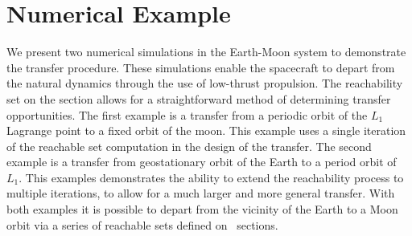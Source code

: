 \documentclass[smallcondensed]{svjour3}
\begin{document}
\section{Numerical Example}\label{sec:simulation}
We present two numerical simulations in the Earth-Moon system to demonstrate the transfer procedure.
These simulations enable the spacecraft to depart from the natural dynamics through the use of low-thrust propulsion.
The reachability set on the \Poincare section allows for a straightforward method of determining transfer opportunities.
The first example is a transfer from a periodic orbit of the \( L_1 \) Lagrange point to a fixed orbit of the moon.
This example uses a single iteration of the reachable set computation in the design of the transfer.
The second example is a transfer from geostationary orbit of the Earth to a period orbit of \( L_1 \). 
This examples demonstrates the ability to extend the reachability process to multiple iterations, to allow for a much larger and more general transfer.
With both examples it is possible to depart from the vicinity of the Earth to a Moon orbit via a series of reachable sets defined on \Poincare~sections.
\end{document}
